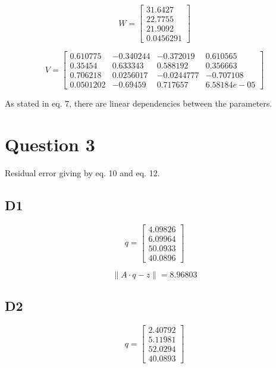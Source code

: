 \begin{equation}
W=\begin{bmatrix} 31.6427 \\ 22.7755 \\ 21.9092 \\ 0.0456291  \end{bmatrix}
\label{eq:} 
\end{equation}

\begin{equation}
V=\begin{bmatrix}  

0.610775 & -0.340244 & -0.372019 & 0.610565 \\
0.35454 & 0.633343 & 0.588192 & 0.356663 \\
0.706218 & 0.0256017 & -0.0244777 & -0.707108 \\
0.0501202 & -0.69459 & 0.717657 & 6.58184e-05  \end{bmatrix}
\label{eq:} 
\end{equation}

As stated in eq. 7, there are linear dependencies between the parameters.

\section*{Question 3}
Residual error giving by eq. 10 and eq. 12.

\subsection*{D1}
\begin{equation}
q=\begin{bmatrix} 4.09826 \\ 6.09964 \\ 50.0933 \\ 40.0896  \end{bmatrix}
\label{eq:} 
\end{equation}

\begin{equation}
\left\| A\cdot q-z \right\| = 8.96803
\label{eq:} 
\end{equation}


\subsection*{D2}

\begin{equation}
q=\begin{bmatrix} 2.40792 \\ 5.11981 \\ 52.0294 \\ 40.0893  \end{bmatrix}
\label{eq:} 
\end{equation}

